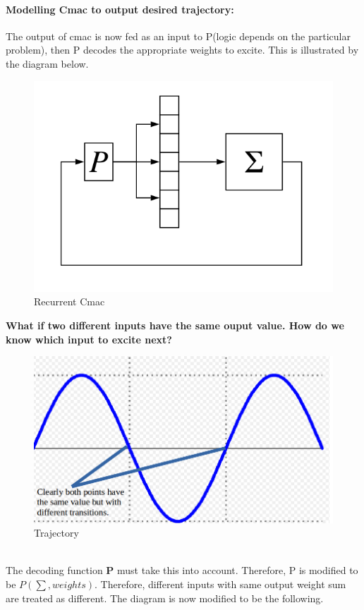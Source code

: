 \documentclass{article}
\begin{document}
\paragraph{Modelling Cmac to output desired trajectory:}
The output of cmac is now fed as an input to P(logic depends on the particular problem), then P decodes
the appropriate weights to excite. This is illustrated by the diagram below.

  \begin{figure}[h!]
    \centering
    \includegraphics[scale=0.2]{./Data/statemodelling.png}
    \caption{Recurrent Cmac}
  \end{figure}

  \textbf{What if two different inputs have the same ouput value. How do we know which input to excite next?}
  \begin{figure}[h!]
    \centering
    \includegraphics[scale=0.2]{./Data/model2.png}
    \caption{Trajectory}
  \end{figure} \\
  The decoding function \textbf{P} must take this into account. Therefore,  P is modified to be $P(\sum,weights)$. Therefore,
  different inputs with same output weight sum are treated as different. The diagram is now modified to be the following.
\end{document}

